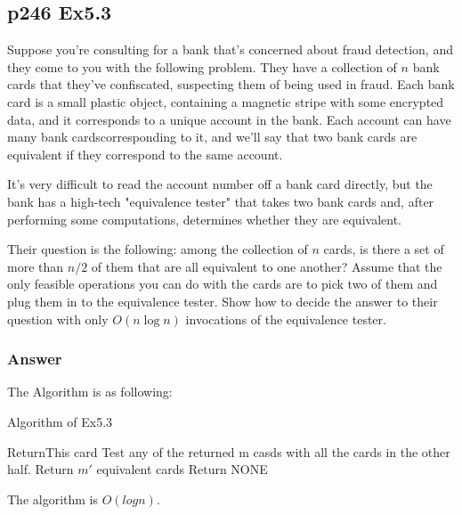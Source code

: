 \documentclass[a4paper]{article}
\begin{document}
\subsection*{p246 Ex5.3}
\begin{adjustwidth}{1cm}{1cm}
	Suppose you're consulting for a bank that's concerned about fraud detection, and they come to you with the following problem. They have a collection of $n$ bank cards that they've confiscated, suspecting them of being used in fraud. Each bank card is a small plastic object, containing a magnetic stripe with some encrypted data, and it corresponds to a unique account in the bank. Each account can have many bank cardscorresponding to it, and we'll say that two bank cards are equivalent if they correspond to the same account.

	It's very difficult to read the account number off a bank card directly, but the bank has a high-tech "equivalence tester" that takes two bank cards and, after performing some computations, determines whether they are equivalent.

	Their question is the following: among the collection of $n$ cards, is there a set of more than $n / 2$ of them that are all equivalent to one another? Assume that the only feasible operations you can do with the cards are to pick two of them and plug them in to the equivalence tester. Show how
	to decide the answer to their question with only $O(n \log n)$ invocations of the equivalence tester.
\end{adjustwidth}

\subsubsection*{Answer}
\par The Algorithm is as following:
\begin{algorithm}[!htb]
	\caption{Algorithm of Ex5.3}
	\begin{algorithmic}[1]
		\State Return{This card}
		\State Test any of the returned m casds with all the cards in the other half.
		\State Return $m'$ equivalent cards
		\EndIf
		\Else
		\State Return NONE
		\EndIf
		\EndFunction
	\end{algorithmic}
\end{algorithm}
\par The algorithm is $O(logn)$.
\vspace{2cm}
\end{document}
